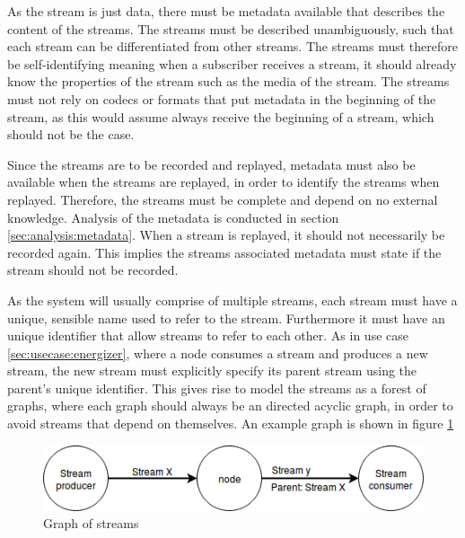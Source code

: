 
As the stream is just data, there must be metadata available that describes the content of the streams. The streams must be described unambiguously, such that each stream can be differentiated from other streams. The streams must therefore be self-identifying meaning when a subscriber receives a stream, it should already know the properties of the stream such as the media of the stream. The streams must not rely on codecs or formats that put metadata in the beginning of the stream, as this would assume  always receive the beginning of a stream, which should not be the case.

Since the streams are to be recorded and replayed, metadata must also be available when the streams are replayed, in order to identify the streams when replayed. Therefore, the streams must be complete and depend on no external knowledge. Analysis of the metadata is conducted in section \ref{sec:analysis:metadata}. When a stream is replayed, it should not necessarily be recorded again. This implies the streams associated metadata must state if the stream should not be recorded.

As the system will usually comprise of multiple streams, each stream must have a unique, sensible name used to refer to the stream. Furthermore it must have an unique identifier that allow streams to refer to each other.
As in use case \ref{sec:usecase:energizer}, where a node consumes a stream and produces a new stream, the new stream must explicitly specify its parent stream using the parent's unique identifier. This gives rise to model the streams as a forest of graphs, where each graph should always be an directed acyclic graph, in order to avoid streams that depend on themselves. An example graph is shown in figure \ref{fig:analysis:graph}

\begin{figure}[h!]
	\centering
	\includegraphics[width=1\textwidth]{figures/stream-graph}
	\caption{Graph of streams} \label{fig:analysis:graph}
\end{figure}

